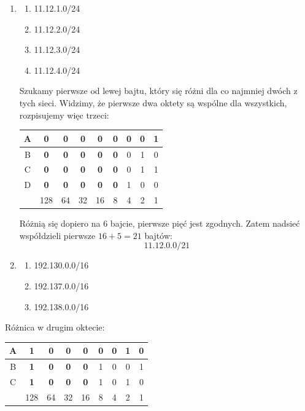 \documentclass[12pt]{article}
\begin{document}
    \begin{enumerate}
        \item
        \begin{enumerate}[label=(\Alph*)]
            \item 11.12.1.0/24
            \item 11.12.2.0/24
            \item 11.12.3.0/24
            \item 11.12.4.0/24
        \end{enumerate}
        Szukamy pierwsze od lewej bajtu, który się różni dla co najmniej dwóch z tych sieci. Widzimy, że pierwsze dwa
        oktety są wspólne dla wszystkich, rozpisujemy więc trzeci:
        \begin{center}
            \begin{tabular}{c || c c c c c | c c c}
                A & \textbf{0} & \textbf{0} & \textbf{0} & \textbf{0} & \textbf{0} & 0 & 0 & 1\\
                \hline
                B & \textbf{0} & \textbf{0} & \textbf{0} & \textbf{0} & \textbf{0} & 0 & 1 & 0\\
                \hline
                C & \textbf{0} & \textbf{0} & \textbf{0} & \textbf{0} & \textbf{0} & 0 & 1 & 1\\
                \hline
                D & \textbf{0} & \textbf{0} & \textbf{0} & \textbf{0} & \textbf{0} & 1 & 0 & 0\\
                \hline
                \hline
                & 128 & 64 & 32 & 16 & 8 & 4 & 2 & 1\\
            \end{tabular}
        \end{center}
        Różnią się dopiero na 6 bajcie, pierwsze pięć jest zgodnych. Zatem nadsieć współdzieli pierwsze $16+5=21$ bajtów:
        \[11.12.0.0/21\]

        \item
        \begin{enumerate}[label=(\Alph*)]
            \item 192.130.0.0/16
            \item 192.137.0.0/16
            \item 192.138.0.0/16
        \end{enumerate}
    \end{enumerate}
    Różnica w drugim oktecie:
    \begin{center}
        \begin{tabular}{c || c c c c | c c c c}
            A & \textbf{1} & \textbf{0} & \textbf{0} & \textbf{0} & 0 & 0 & 1 & 0\\
            \hline
            B & \textbf{1} & \textbf{0} & \textbf{0} & \textbf{0} & 1 & 0 & 0 & 1\\
            \hline
            C & \textbf{1} & \textbf{0} & \textbf{0} & \textbf{0} & 1 & 0 & 1 & 0\\
            \hline
            \hline
            & 128 & 64 & 32 & 16 & 8 & 4 & 2 & 1\\
        \end{tabular}
    \end{center}
\end{document}
